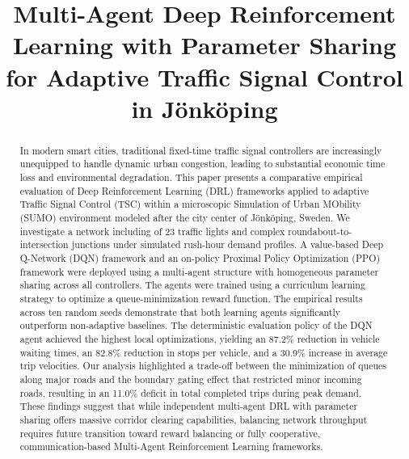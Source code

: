 \documentclass[conference]{IEEEtran}
\begin{document}
\title{Multi-Agent Deep Reinforcement Learning with Parameter Sharing for Adaptive Traffic Signal Control in Jönköping}

\author{
\and
{}
}

\maketitle

\begin{abstract}
In modern smart cities, traditional fixed-time traffic signal controllers are increasingly unequipped to handle dynamic urban congestion, leading to substantial economic time loss and environmental degradation. This paper presents a comparative empirical evaluation of Deep Reinforcement Learning (DRL) frameworks applied to adaptive Traffic Signal Control (TSC) within a microscopic Simulation of Urban MObility (SUMO) environment modeled after the city center of Jönköping, Sweden. We investigate a network including of 23 traffic lights and complex roundabout-to-intersection junctions under simulated rush-hour demand profiles. A value-based Deep Q-Network (DQN) framework and an on-policy Proximal Policy Optimization (PPO) framework were deployed using a multi-agent structure with homogeneous parameter sharing across all controllers. The agents were trained using a curriculum learning strategy to optimize a queue-minimization reward function. The empirical results across ten random seeds demonstrate that both learning agents significantly outperform non-adaptive baselines. The deterministic evaluation policy of the DQN agent achieved the highest local optimizations, yielding an 87.2\% reduction in vehicle waiting times, an 82.8\% reduction in stops per vehicle, and a 30.9\% increase in average trip velocities. Our analysis highlighted a trade-off between the minimization of queues along major roads and the boundary gating effect that restricted minor incoming roads, resulting in an 11.0\% deficit in total completed trips during peak demand. These findings suggest that while independent multi-agent DRL with parameter sharing offers massive corridor clearing capabilities, balancing network throughput requires future transition toward reward balancing or fully cooperative, communication-based Multi-Agent Reinforcement Learning frameworks.
\end{abstract}
\end{document}
